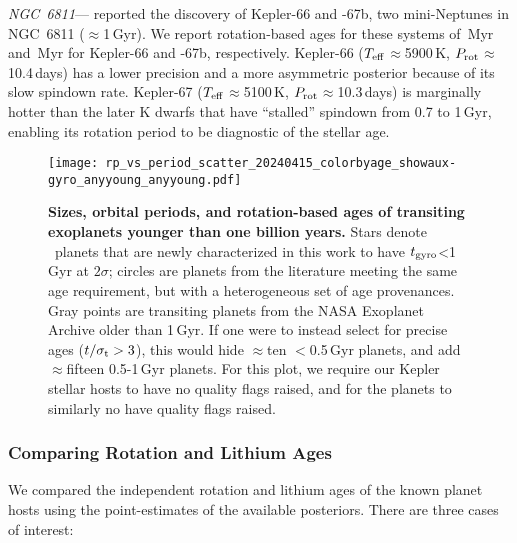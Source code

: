 \documentclass[11pt,twocolumn,tighten]{aastex63}
\begin{document}
{\it NGC~6811}---\citet{Meibom_2013} reported the discovery of
Kepler-66 and -67b, two mini-Neptunes in NGC~6811 ($\approx$1\,Gyr).
We report rotation-based ages for these systems of
\kepsixsixtgyro\,Myr and \kepsixseventgyro\,Myr for Kepler-66 and
-67b, respectively.  Kepler-66 ($T_{\rm eff}$$\approx$5900\,K, $P_{\rm
rot}$$\approx$10.4\,days) has a lower precision and a more asymmetric
posterior because of its slow spindown rate.  Kepler-67 ($T_{\rm eff}$$\approx$5100\,K, $P_{\rm
rot}$$\approx$10.3\,days) is marginally hotter than the later K dwarfs
that have ``stalled'' spindown from 0.7 to 1\,Gyr, enabling its
rotation period to be diagnostic of the stellar age.

\begin{figure}[!t]
  \begin{center}
    \texttt{[image: rp\_vs\_period\_scatter\_20240415\_colorbyage\_showaux-gyro\_anyyoung\_anyyoung.pdf]}
  \end{center}
  \vspace{-0.5cm}
  \caption{
    {\bf Sizes, orbital periods, and rotation-based ages of transiting
    exoplanets younger than one billion years.} Stars denote
    \nplyounggyrotwosigmanograzingnoruwe\ planets that are newly
    characterized in this work to have $t_{\rm gyro}$<1\,Gyr at
    $2$$\sigma$; circles are planets from the literature meeting the
    same age requirement, but with a heterogeneous set of age
    provenances.  Gray points are transiting planets from the NASA
    Exoplanet Archive older than 1\,Gyr.  If one were to instead
    select for precise ages ($t/\sigma_{\rm t}>3$), this would hide
    $\approx$ten $<$0.5\,Gyr planets, and add $\approx$fifteen
    0.5-1\,Gyr planets.  For this plot, we require our Kepler stellar
    hosts to have no quality flags raised, and for the planets to
    similarly no have quality flags raised. 
    \label{fig:rp_period_age_results}
  }
\end{figure}

\subsubsection{Comparing Rotation and Lithium Ages}

We compared the independent rotation and lithium ages of the
known planet hosts using the point-estimates of the available
posteriors.  There are three cases of interest:
\end{document}
